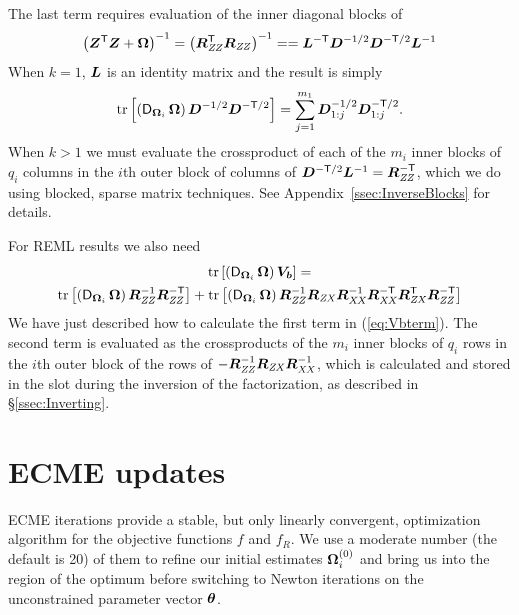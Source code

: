 \documentclass[12pt]{article}
\begin{document}
The last term requires evaluation of the
inner diagonal blocks of 
\begin{equation}
  \label{eq:ZtZinv}
  \left(\bm{Z}^\mathsf{T}\bm{Z} +\bm{\Omega}\right)^{-1}=\left(\bm{R}_\mathit{ZZ}^\mathsf{T}\bm{R}_\mathit{ZZ}\right)^{-1}=
  =\bm{L}^{-\mathsf{T}}\bm{D}^{-1/2}\bm{D}^{-\mathsf{T}/2}\bm{L}^{-1}
\end{equation}
When $k=1$, $\bm{L}$ is an identity
matrix and the result is simply
\begin{equation*}
  \operatorname{tr}\left[\left(\operatorname{\mathsf{D}}_{\bm{\Omega}_i}\bm{\Omega}\right)
    \bm{D}^{-1/2}\bm{D}^{-\mathsf{T}/2}\right]=
  \sum_{j=1}^{m_1}\bm{D}_{1:j}^{-1/2}\bm{D}_{1:j}^{-\mathsf{T}/2} .
\end{equation*}
When $k>1$ we must evaluate the crossproduct of each of the $m_i$
inner blocks of $q_i$ columns in the $i$th outer block of columns of
$\bm{D}^{-\mathsf{T}/2}\bm{L}^{-1}=\bm{R}_\mathit{ZZ}^{-\mathsf{T}}$, which we do using blocked, sparse
matrix techniques.  See Appendix~\ref{ssec:InverseBlocks} for details.

For REML results we also need
\begin{multline}
  \label{eq:Vbterm}
  \operatorname{tr}\left[\left(\operatorname{\mathsf{D}}_{\bm{\Omega}_i}\bm{\Omega}\right)\bm{V}_{\bm{b}}\right] = \\
  \operatorname{tr}\left[\left(\operatorname{\mathsf{D}}_{\bm{\Omega}_i}\bm{\Omega}\right)
    \bm{R}_\mathit{ZZ}^{-1}\bm{R}_\mathit{ZZ}^{-\mathsf{T}}\right]
  + \operatorname{tr}\left[\left(\operatorname{\mathsf{D}}_{\bm{\Omega}_i}\bm{\Omega}\right)
    \bm{R}_\mathit{ZZ}^{-1}\bm{R}_\mathit{ZX}\bm{R}_\mathit{XX}^{-1}\bm{R}_\mathit{XX}^{-\mathsf{T}}\bm{R}_\mathit{ZX}^\mathsf{T}\bm{R}_\mathit{ZZ}^{-\mathsf{T}}\right]
\end{multline}
We have just described how to calculate the first term in
(\ref{eq:Vbterm}).  The second term is evaluated as the crossproducts
of the $m_i$ inner blocks of $q_i$ rows in the $i$th outer block of the rows
of $-\bm{R}_\mathit{ZZ}^{-1}\bm{R}_\mathit{ZX}\bm{R}_\mathit{XX}^{-1}$, which is calculated and stored in the
 slot during the inversion of the factorization, as
described in \S\ref{ssec:Inverting}.

\section{ECME updates}
\label{sec:ECME}

ECME iterations provide a stable, but only linearly convergent,
optimization algorithm for the objective functions $f$ and $f_R$.  We
use a moderate number (the default is 20) of them to refine our
initial estimates $\bm{\Omega}_i^{(0)}$ and bring us into the region of
the optimum before switching to Newton iterations on the unconstrained
parameter vector $\bm{\theta}$.
\end{document}
